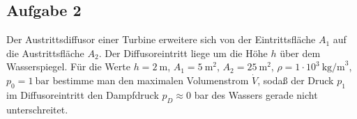 \documentclass[a4paper,11pt]{article}
\begin{document}
\subsection*{Aufgabe 2}
Der Austrittsdiffusor einer Turbine erweitere sich von der Eintrittsfläche $A_1$ auf die Austrittsfläche $A_2$. Der Diffusoreintritt liege um die Höhe $h$ über dem Wasserspiegel.
Für die Werte $h = 2 ~\text{m}$, $A_1 = 5 ~\text{m}^2$, $A_2 = 25 ~\text{m}^2$, $\rho = 1 \cdot 10^3 ~\text{kg/m}^3$, $p_0 = 1 ~\text{bar}$ bestimme man den maximalen Volumenstrom $\dot{V}$, sodaß der Druck $p_1$ im Diffusoreintritt
den Dampfdruck $p_D \approx 0$ bar des Wassers gerade nicht unterschreitet.
\begin{figure}[h]
\centering
{}
\end{figure}
\end{document}
